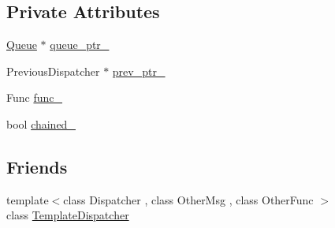 \subsection*{Private Attributes}
\begin{DoxyCompactItemize}
\item 
\hyperlink{classmessaging_1_1Queue}{Queue} $\ast$ \hyperlink{classmessaging_1_1TemplateDispatcher_a1c84a8173b54823d7b95db4d4865e134}{queue\-\_\-ptr\-\_\-}
\item 
Previous\-Dispatcher $\ast$ \hyperlink{classmessaging_1_1TemplateDispatcher_a873bc46a8c8cff1ddcceb225ad252e01}{prev\-\_\-ptr\-\_\-}
\item 
Func \hyperlink{classmessaging_1_1TemplateDispatcher_aae5b9ea3d2b58005b6ddec368db2bcb0}{func\-\_\-}
\item 
bool \hyperlink{classmessaging_1_1TemplateDispatcher_a51f4255d452392ab1ca7d193d3209d4a}{chained\-\_\-}
\end{DoxyCompactItemize}
\subsection*{Friends}
\begin{DoxyCompactItemize}
\item 
{\footnotesize template$<$class Dispatcher , class Other\-Msg , class Other\-Func $>$ }\\class \hyperlink{classmessaging_1_1TemplateDispatcher_ac52eebabf93ac84bc8eacc5c67e6ca9f}{Template\-Dispatcher}
\end{DoxyCompactItemize}


